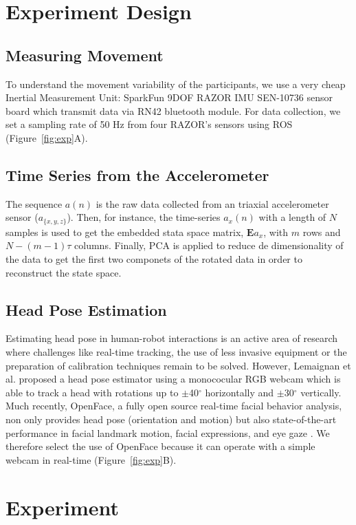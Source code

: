 \documentclass{sigchi}
\begin{document}
\section{Experiment Design}

\subsection{Measuring Movement}
To understand the movement variability of the participants, we use a very cheap
Inertial Measurement Unit: SparkFun 9DOF RAZOR IMU SEN-10736 sensor board
which transmit data via RN42 bluetooth module.
For data collection, we set a sampling rate of 50 Hz from four RAZOR's sensors
using ROS \cite{quigley2009} (Figure~\ref{fig:exp}A).

\subsection{Time Series from the Accelerometer}
The sequence $a(n)$ is the raw data collected from an triaxial accelerometer sensor
($a_{ \{ x,y,z \} }$). Then, for instance, the time-series $a_x(n)$
with a length of $N$ samples is used to get the embedded stata space matrix,
$\boldsymbol{E} a_{x}$, with $m$ rows and $N-(m-1)\tau$ columns.
Finally, PCA is applied to reduce de dimensionality of the data
to get the first two componets of the rotated data in order
to reconstruct the state space.


\subsection{Head Pose Estimation}
Estimating head pose in human-robot interactions is an active area of research
where challenges like real-time tracking, the use of less invasive equipment
or the preparation of calibration techniques remain to be solved.
However, Lemaignan et al. \cite{Lemaignan2016} proposed a head pose estimator
using a monococular RGB webcam which is able to track a head with rotations up
to $\pm$40$^{\circ}$ horizontally and $\pm$30$^{\circ}$ vertically.
Much recently, OpenFace, a fully open source real-time facial behavior analysis,
non only provides head pose (orientation and motion) but also state-of-the-art
performance in facial landmark motion, facial expressions, and eye gaze \cite{Baltrusaitis2016}.
We therefore select the use of OpenFace because it can operate with a simple webcam
in real-time (Figure~\ref{fig:exp}B).



\section{Experiment}
\end{document}
